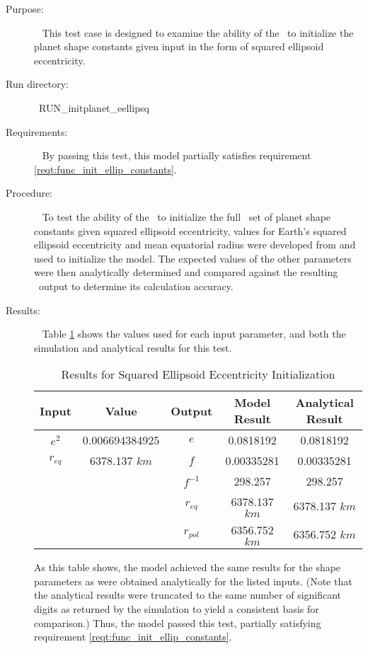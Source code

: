 \label{test:init_eellipsq}
\begin{description}
\item[Purpose:]\ \newline
This test case is designed to examine the ability of the \planetDesc\ to
initialize the planet shape constants given input in the form of squared
ellipsoid eccentricity.
\item[Run directory:]\ \newline RUN\_initplanet\_eellipsq
\item[Requirements:]\ \newline
By passing this test, this model partially satisfies requirement
\mbox{\ref{reqt:func_init_ellip_constants}}.

\item[Procedure:]\ \newline
To test the ability of the \planetDesc\ to initialize the full \JEODid\ set of
planet shape constants given squared ellipsoid eccentricity, values for Earth's
squared ellipsoid eccentricity and mean equatorial radius were developed from
\cite{ValladoSecond} and used to initialize the model.  The expected values of
the other parameters were then analytically determined and compared against the
resulting \planetDesc\ output to determine its calculation accuracy.

\item[Results:]\ \newline
Table \ref{eellipsq_init_table} shows the values used for each input parameter,
and both the simulation and analytical results for this test.

\begin{table}[ht]
\begin{center}
\begin{tabular}{|c|c|c|c|c|}\hline
 Input & Value & Output & Model Result & Analytical Result \\ \hline
 $e^2$ & 0.006694384925 & $e$ & 0.0818192 & 0.0818192 \\ \hline
 $r_{eq}$ & 6378.137 $km$ & $f$ & 0.00335281 & 0.00335281 \\ \hline
   &   & $f^{-1}$ & 298.257 & 298.257 \\ \hline
   &   & $r_{eq}$ & 6378.137 $km$ & 6378.137 $km$ \\ \hline
   &   & $r_{pol}$ & 6356.752 $km$ & 6356.752 $km$ \\ \hline
\end{tabular}
\caption{Results for Squared Ellipsoid Eccentricity Initialization}
\label{eellipsq_init_table}
\end{center}
\end{table}

As this table shows, the model achieved the same results for the shape
parameters as were obtained analytically for the listed inputs. (Note that the
analytical results were truncated to the same number of significant digits as
returned by the simulation to yield a consistent basis for comparison.) Thus,
the model passed this test, partially satisfying requirement
\mbox{\ref{reqt:func_init_ellip_constants}}.
\end{description}


